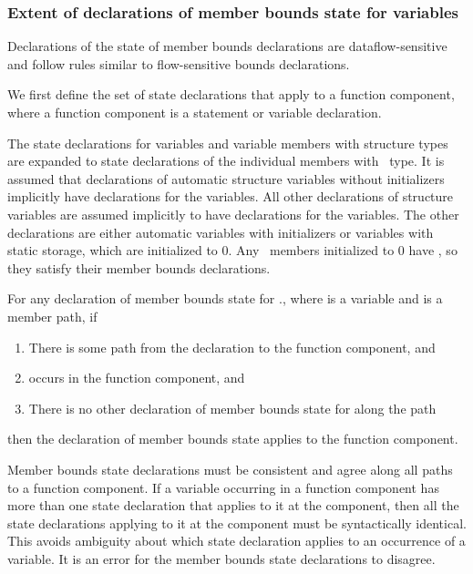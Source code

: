 \subsubsection{Extent of declarations of member bounds state for variables}
\label{section:member-bounds-state-extent}

Declarations of the state of member bounds declarations are dataflow-sensitive
and follow rules similar to flow-sensitive bounds declarations.

We first define the set of state declarations that apply to a function
component, where a function component is a statement or
variable declaration.

The state declarations for variables and variable members with structure
types are expanded to state declarations of the individual members with
\arrayptr\ type. It is assumed that declarations of automatic
structure variables without initializers implicitly have 
declarations for the variables. All other declarations of structure
variables are assumed implicitly to have  declarations for the
variables. The other declarations are either automatic variables with
initializers or variables with static storage, which are initialized to
0. Any \arrayptr\ members initialized to 0 have \boundsany, so
they satisfy their member bounds declarations.

For any declaration of member bounds state for ., where
 is a variable and  is a member path, if
\begin{enumerate}
\item
  There is some path from the declaration to the function component, and
\item
   occurs in the function component, and
\item
  There is no other declaration of member bounds state for 
  along the path
\end{enumerate}
then the declaration of member bounds state applies to the function
component.

Member bounds state declarations must be consistent and agree
along all paths to a function component.   If a variable occurring in a
function component has more than one state declaration that applies to
it at the component, then all the state declarations applying to it at
the component must be syntactically identical. This avoids ambiguity
about which state declaration applies to an occurrence of a variable.
It is an error for the member bounds state declarations to disagree.

